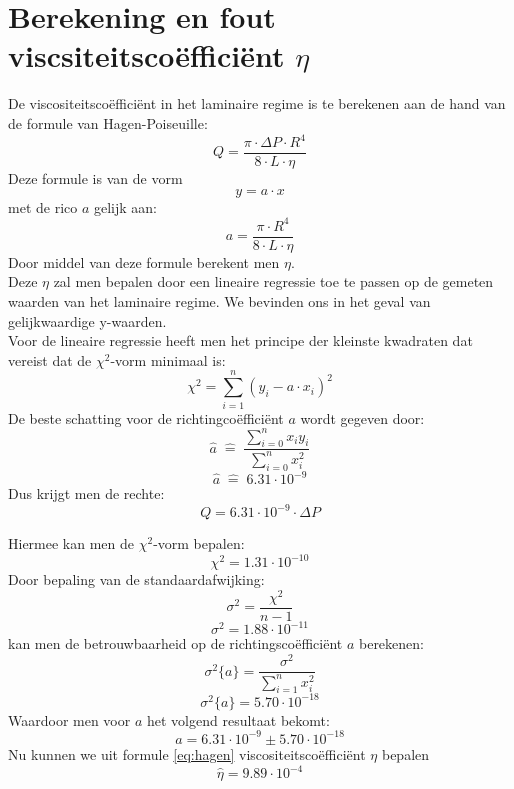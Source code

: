 \section{Berekening en fout viscsiteitsco\"effici\"ent $\eta$}

De viscositeitsco\"effici\"ent in het laminaire regime is
te berekenen aan de hand van de formule van Hagen-Poiseuille:
\begin{equation}
    \label{eq:hagen}
    Q = \frac{\pi \cdot \Delta P \cdot R^4}{8 \cdot L \cdot \eta}
\end{equation}
Deze formule is van de vorm $$y=a\cdot x$$ met de rico $a$ gelijk aan:
$$a = \frac{\pi \cdot R^4}{8 \cdot L \cdot \eta}$$
Door middel van deze formule berekent men $\eta$. \\

Deze $\eta$ zal men bepalen door een lineaire regressie toe te passen
op de gemeten waarden van het laminaire regime. We bevinden ons in
het geval van gelijkwaardige y-waarden.\\

Voor de lineaire regressie heeft men het principe der kleinste kwadraten
dat vereist dat de $\chi ^2$-vorm minimaal is: 
\begin{equation}
    \chi ^2 = \sum\limits_{i=1}^n(y_i-a\cdot x_i)^2
\end{equation}
De beste schatting voor de richtingco\"effici\"ent $a$ wordt gegeven door:
\begin{equation}
    \label{eq:a}
    \hat{a} \; \hat{=} \;\frac{\sum\limits_{i=0}^n x_i  y_i}{\sum\limits_{i=0}^n x_i^2}
\end{equation}
\begin{equation*}
    \hat{a} \; \hat{=} \; 6.31 \cdot 10^{-9}
\end{equation*}
Dus krijgt men de rechte:
$$Q = 6.31\cdot 10^{-9} \cdot \Delta P$$

Hiermee kan men de $\chi ^2$-vorm bepalen:
\begin{equation*}
    \chi ^2 = 1.31 \cdot 10^{-10}
\end{equation*}
Door bepaling van de standaardafwijking: 
\begin{equation}
    \sigma ^2 = \frac{\chi ^2}{n - 1}
\end{equation}
\begin{equation*}
    \sigma ^2 = 1.88 \cdot 10^{-11}
\end{equation*}
kan men de betrouwbaarheid op de richtingsco\"effici\"ent $a$ berekenen: 
\begin{equation}
    \label{eq:sa}
    \sigma ^2 \{ a \} = \frac{\sigma ^2}{\sum\limits_{i=1}^n x_i^2}
\end{equation}
\begin{equation*}
    \sigma ^2 \{ a \} =  5.70 \cdot 10^{-18}
\end{equation*}
Waardoor men voor $a$ het volgend resultaat bekomt:
$$a = 6.31 \cdot 10^{-9} \pm 5.70 \cdot 10^{-18}$$
Nu kunnen we uit formule \eqref{eq:hagen} viscositeitsco\"effici\"ent $\eta$ bepalen
\begin{equation*}
    \hat{\eta} = 9.89 \cdot 10^{-4}
\end{equation*}

